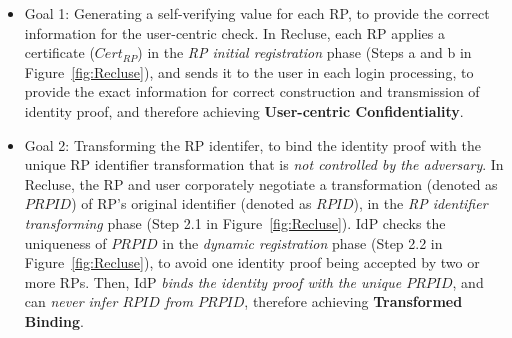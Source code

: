\begin{itemize}
 \item Goal 1: Generating a self-verifying value for each RP, to provide the correct information for the user-centric check.
  In Recluse, each RP applies a certificate ($Cert_{RP}$) in the \emph{RP initial registration} phase (Steps a and b in Figure~\ref{fig:Recluse}),
  and sends it to the user in each login processing,
  to provide the exact information for  correct construction and transmission of identity proof,
             and therefore achieving \textbf{User-centric Confidentiality}.




    \item Goal 2: Transforming the RP identifer, to bind the identity proof with the unique RP identifier transformation that is \emph{not controlled by the adversary}.
  In Recluse, the RP and user corporately negotiate a transformation (denoted as $PRPID$) of RP's original identifier (denoted as $RPID$), in the \emph{RP identifier transforming} phase (Step 2.1 in Figure~\ref{fig:Recluse}).
  IdP checks the uniqueness of $PRPID$ in the \emph{dynamic registration} phase (Step 2.2 in Figure~\ref{fig:Recluse}),  to avoid one identity proof being accepted by two or more RPs.
  Then, IdP  \emph{binds the identity proof with the unique $PRPID$}, and  can \emph{ never infer $RPID$ from $PRPID$},
   therefore achieving \textbf{Transformed Binding}.


\end{itemize}
